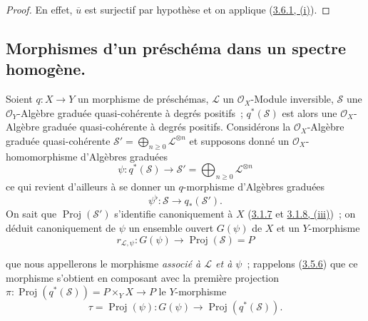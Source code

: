 \begin{proof}
En effet, $\overline{u}$ est surjectif par hypothèse et on applique
(\hyperref[II.3.6.1-fr]{3.6.1, (i)}).
\end{proof}

\subsection{Morphismes d'un préschéma dans un spectre homogène.}
\label{subsection:II.3.7-fr}

\begin{env}[3.7.1]
\label{II.3.7.1-fr}
Soient $q:X\to Y$ un morphisme de préschémas, $\mathcal{L}$ un
$\mathcal{O}_X$-Module inversible, $\mathcal{S}$ une $\mathcal{O}_Y$-Algèbre
graduée quasi-cohérente à degrés positifs~; $q^*(\mathcal{S})$ est alors une
$\mathcal{O}_X$-Algèbre graduée quasi-cohérente à degrés positifs.
Considérons la $\mathcal{O}_X$-Algèbre graduée quasi-cohérente
$\mathcal{S}'=\bigoplus_{n\geq0}\mathcal{L}^{\otimes n}$ et supposons donné
un $\mathcal{O}_X$-homomorphisme d'Algèbres graduées
\[
  \psi:q^*(\mathcal{S})\longrightarrow
  \mathcal{S}'=\bigoplus_{n\geq0}\mathcal{L}^{\otimes n}
\]
ce qui revient d'ailleurs à se donner un $q$-morphisme d'Algèbres graduées
\[
  \psi^\flat:\mathcal{S}\longrightarrow q_*(\mathcal{S}').
\]
On sait que $\operatorname{Proj}(\mathcal{S}')$ s'identifie canoniquement à
$X$ (\hyperref[II.3.1.7-fr]{3.1.7} et
\hyperref[II.3.1.8-fr]{3.1.8, (iii)})~; on déduit canoniquement de $\psi$ un
ensemble ouvert $G(\psi)$ de $X$ et un $Y$-morphisme
\[
\label{II.3.7.1.1-fr}
  r_{\mathcal{L},\psi}:G(\psi)\longrightarrow
  \operatorname{Proj}(\mathcal{S})=P
\tag{3.7.1.1}
\]


que nous appellerons le morphisme \emph{associé à $\mathcal{L}$ et à $\psi$}~;
rappelons (\hyperref[II.3.5.6-fr]{3.5.6}) que ce morphisme s'obtient en
composant avec la première projection
$\pi:\operatorname{Proj}(q^*(\mathcal{S}))=P\times_YX\to P$ le
$Y$-morphisme
\[
  \tau=\operatorname{Proj}(\psi):G(\psi)\longrightarrow
  \operatorname{Proj}(q^*(\mathcal{S})).
\]
\end{env}

